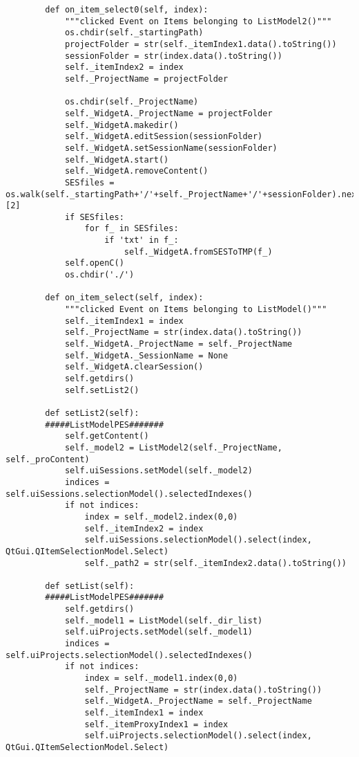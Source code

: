 \begin{verbatim}
        def on_item_select0(self, index):
            """clicked Event on Items belonging to ListModel2()"""
            os.chdir(self._startingPath)
            projectFolder = str(self._itemIndex1.data().toString())
            sessionFolder = str(index.data().toString())
            self._itemIndex2 = index
            self._ProjectName = projectFolder
    
            os.chdir(self._ProjectName)
            self._WidgetA._ProjectName = projectFolder
            self._WidgetA.makedir()
            self._WidgetA.editSession(sessionFolder)
            self._WidgetA.setSessionName(sessionFolder)
            self._WidgetA.start()
            self._WidgetA.removeContent()
            SESfiles = os.walk(self._startingPath+'/'+self._ProjectName+'/'+sessionFolder).next()[2]
            if SESfiles:
                for f_ in SESfiles:
                    if 'txt' in f_:
                        self._WidgetA.fromSESToTMP(f_)
            self.openC()
            os.chdir('./')
    
        def on_item_select(self, index):
            """clicked Event on Items belonging to ListModel()"""
            self._itemIndex1 = index
            self._ProjectName = str(index.data().toString())
            self._WidgetA._ProjectName = self._ProjectName
            self._WidgetA._SessionName = None
            self._WidgetA.clearSession()
            self.getdirs()
            self.setList2()
    
        def setList2(self):
        #####ListModelPES#######
            self.getContent()
            self._model2 = ListModel2(self._ProjectName, self._proContent)
            self.uiSessions.setModel(self._model2)
            indices = self.uiSessions.selectionModel().selectedIndexes()
            if not indices:
                index = self._model2.index(0,0)
                self._itemIndex2 = index
                self.uiSessions.selectionModel().select(index, QtGui.QItemSelectionModel.Select)
                self._path2 = str(self._itemIndex2.data().toString())
    
        def setList(self):
        #####ListModelPES#######
            self.getdirs() 
            self._model1 = ListModel(self._dir_list)
            self.uiProjects.setModel(self._model1)
            indices = self.uiProjects.selectionModel().selectedIndexes()
            if not indices:
                index = self._model1.index(0,0)
                self._ProjectName = str(index.data().toString())
                self._WidgetA._ProjectName = self._ProjectName
                self._itemIndex1 = index
                self._itemProxyIndex1 = index
                self.uiProjects.selectionModel().select(index, QtGui.QItemSelectionModel.Select)
    

\end{verbatim}
